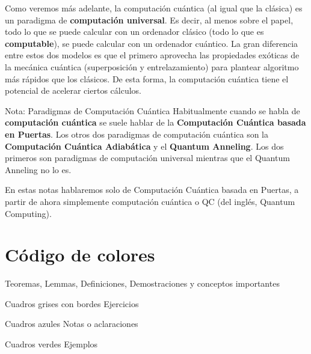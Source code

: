 \documentclass[a4paper,11pt]{book} %
\numberwithin{equation}{chapter}
\begin{document}
Como veremos más adelante, la computación cuántica (al igual que la clásica) es un paradigma de \textbf{computación universal}. Es decir, al menos sobre el papel, todo lo que se puede calcular con un ordenador clásico (todo lo que es \textbf{computable}), se puede calcular con un ordenador cuántico. La gran diferencia entre estos dos modelos es que el primero aprovecha las propiedades exóticas de la mecánica cuántica (superposición y entrelazamiento) para plantear algoritmo más rápidos que los clásicos. De esta forma, la computación cuántica tiene el potencial de acelerar ciertos cálculos. 


	\begin{mybox_blue}{Nota: Paradigmas de Computación Cuántica}
	Habitualmente cuando se habla de \textbf{computación cuántica} se suele hablar de la \textbf{Computación 
	Cuántica basada en Puertas}. Los otros dos paradigmas de computación cuántica son la \textbf{Computación
	Cuántica Adiabática} y el \textbf{Quantum Anneling}. Los dos primeros son paradigmas de computación
	universal mientras que el Quantum Anneling no lo es. \vspace{0.3cm}
	
	En estas notas hablaremos solo de Computación Cuántica basada en Puertas, a partir de ahora simplemente
	computación cuántica o QC (del inglés, Quantum Computing).
	\end{mybox_blue}	




\newpage

\section*{Código de colores}

\begin{mybox_gray2}{}
Teoremas, Lemmas, Definiciones, Demostraciones y conceptos importantes
\end{mybox_gray2}

\begin{mybox_gray}{Cuadros grises con bordes}
Ejercicios
\end{mybox_gray}

\begin{mybox_blue}{Cuadros azules}
Notas o aclaraciones
\end{mybox_blue}

\begin{mybox_green}{Cuadros verdes}
Ejemplos
\end{mybox_green}
\end{document}
